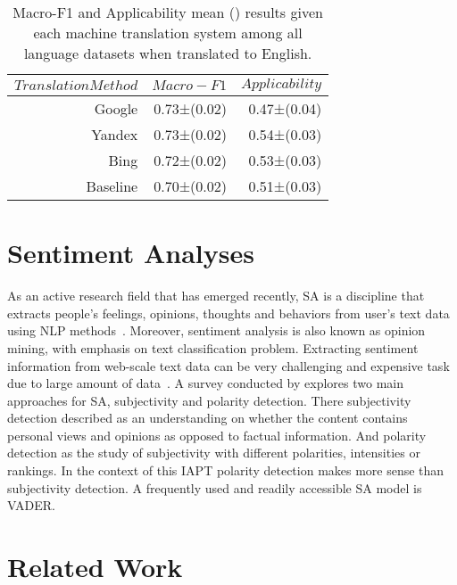 \begin{table*}[ht!]\centering
{}
\begin{tabular}{rrr}\toprule
$Translation Method$ & $Macro-F1$ & $Applicability$\\ \midrule
Google& 0.73±(0.02)& 0.47±(0.04)&\\
Yandex& 0.73±(0.02)& 0.54±(0.03)&\\
Bing& 0.72±(0.02)& 0.53±(0.03)&\\
Baseline& 0.70±(0.02)& 0.51±(0.03)&\\
\bottomrule
\end{tabular}
\caption[Macro-F1 and Applicability mean () results on different Translation Methods]{Macro-F1 and Applicability mean () results given each machine translation system among all language datasets when translated to English.}\label{tab:translators}
\end{table*}

\section{Sentiment Analyses}

As an active research field that has emerged recently, \ac{SA} is a discipline that extracts people’s feelings, opinions, thoughts and behaviors from user’s text data using \ac{NLP} methods~\citep{danneman2014social}.
Moreover, sentiment analysis is also known as opinion mining, with emphasis on text classification problem.
Extracting sentiment information from web-scale text data can be very challenging and expensive task due to large amount of data~\citep{FernndezGavilanes2016}.
A survey conducted by \citet{Lo2016} explores two main approaches for \ac{SA}, subjectivity and polarity detection.
There subjectivity detection described as an understanding on whether the content contains personal views and opinions as opposed to factual information.
And polarity detection as the study of subjectivity with different polarities, intensities or rankings.
In the context of this \ac{IAPT} polarity detection makes more sense than subjectivity detection.
A frequently used and readily accessible \ac{SA} model is \ac{VADER}.



\section{Related Work}
